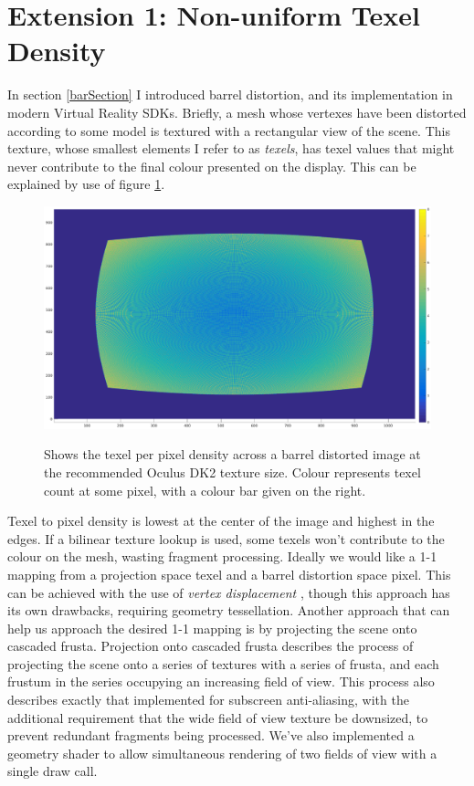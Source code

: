 \documentclass[12pt,a4paper,twoside,openright]{report}
\begin{document}
\section{Extension 1: Non-uniform Texel Density}

In section \ref{barSection} I introduced barrel distortion, and its implementation in modern Virtual Reality SDKs. Briefly, a mesh whose vertexes have been distorted according to some model is textured with a rectangular view of the scene. This texture, whose smallest elements I refer to as \emph{texels}, has texel values that might never contribute to the final colour presented on the display. This can be explained by use of figure \ref{fig:barreldensity1}.

\begin{figure}[tbh]
\begin{centering}
\includegraphics[width=12cm]{figs/oculus_pixel_density.eps}
\label{epsfig1}
 
\caption{Shows the texel per pixel density across a barrel distorted image at the recommended Oculus DK2 texture size. Colour represents texel count at some pixel, with a colour bar given on the right.}
\label{fig:barreldensity1}
\end{centering}
\end{figure}

\noindent Texel to pixel density is lowest at the center of the image and highest in the edges. If a bilinear texture lookup is used, some texels won't contribute to the colour on the mesh, wasting fragment processing. Ideally we would like a 1-1 mapping from a projection space texel and a barrel distortion space pixel. This can be achieved with the use of \emph{vertex displacement} \cite{vertexDisplacement}, though this approach has its own drawbacks, requiring geometry tessellation. Another approach that can help us approach the desired 1-1 mapping is by projecting the scene onto cascaded frusta. Projection onto cascaded frusta describes the process of projecting the scene onto a series of textures with a series of frusta, and each frustum in the series occupying an increasing field of view.
This process also describes exactly that implemented for subscreen anti-aliasing, with the additional requirement that the wide field of view texture be downsized, to prevent redundant fragments being processed. We've also implemented a geometry shader to allow simultaneous rendering of two fields of view with a single draw call. 
\end{document}
